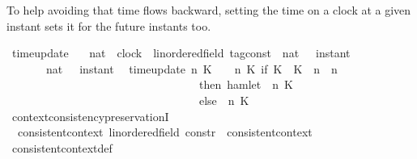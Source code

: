 \begin{isabellebody}
\begin{isamarkuptext}%
To help avoiding that time flows backward, setting the time on a clock at a given 
  instant sets it for the future instants too.%
\end{isamarkuptext}\isamarkuptrue%
\isamarkupfalse%
\ time{\isacharunderscore}update\isanewline
\ \ {\isacharcolon}{\isacharcolon}\ {\isacartoucheopen}nat\ {\isasymRightarrow}\ clock\ {\isasymRightarrow}\ {\isacharparenleft}{\isacharprime}{\isasymtau}{\isacharcolon}{\isacharcolon}linordered{\isacharunderscore}field{\isacharparenright}\ tag{\isacharunderscore}const\ {\isasymRightarrow}\ {\isacharparenleft}nat\ {\isasymRightarrow}\ {\isacharprime}{\isasymtau}\ instant{\isacharparenright}\isanewline
\ \ \ \ \ \ {\isasymRightarrow}\ {\isacharparenleft}nat\ {\isasymRightarrow}\ {\isacharprime}{\isasymtau}\ instant{\isacharparenright}{\isacartoucheclose}\isanewline
{}\isanewline
\ \ {\isacartoucheopen}time{\isacharunderscore}update\ n\ K\ {\isasymtau}\ {\isasymrho}\ {\isacharequal}\ {\isacharparenleft}{\isasymlambda}n{\isacharprime}\ K{\isacharprime}{\isachardot}\ if\ K\ {\isacharequal}\ K{\isacharprime}\ {\isasymand}\ n\ {\isasymle}\ n{\isacharprime}\isanewline
\ \ \ \ \ \ \ \ \ \ \ \ \ \ \ \ \ \ \ \ \ \ \ \ \ \ \ \ \ \ \ \ \ \ then\ {\isacharparenleft}hamlet\ {\isacharparenleft}{\isasymrho}\ n\ K{\isacharparenright}{\isacharcomma}\ {\isasymtau}{\isacharparenright}\isanewline
\ \ \ \ \ \ \ \ \ \ \ \ \ \ \ \ \ \ \ \ \ \ \ \ \ \ \ \ \ \ \ \ \ \ else\ {\isasymrho}\ n{\isacharprime}\ K{\isacharprime}{\isacharparenright}{\isacartoucheclose}%
\isadelimdocument
%
\endisadelimdocument
%
\isatagdocument
%
\isamarkuptrue%
%
\endisatagdocument
{\isafolddocument}%
%
\isadelimdocument
%
\endisadelimdocument
{}\isamarkupfalse%
\ context{\isacharunderscore}consistency{\isacharunderscore}preservationI{\isacharcolon}\isanewline
\ \ {\isacartoucheopen}consistent{\isacharunderscore}context\ {\isacharparenleft}{\isacharparenleft}{\isasymgamma}{\isacharcolon}{\isacharcolon}{\isacharparenleft}{\isacharprime}{\isasymtau}{\isacharcolon}{\isacharcolon}linordered{\isacharunderscore}field{\isacharparenright}\ constr{\isacharparenright}{\isacharhash}{\isasymGamma}{\isacharparenright}\ {\isasymLongrightarrow}\ consistent{\isacharunderscore}context\ {\isasymGamma}{\isacartoucheclose}\isanewline
%
\isadelimproof
%
\endisadelimproof
%
\isatagproof
{}\isamarkupfalse%
\ consistent{\isacharunderscore}context{\isacharunderscore}def\ \isamarkupfalse%

\end{isabellebody}
